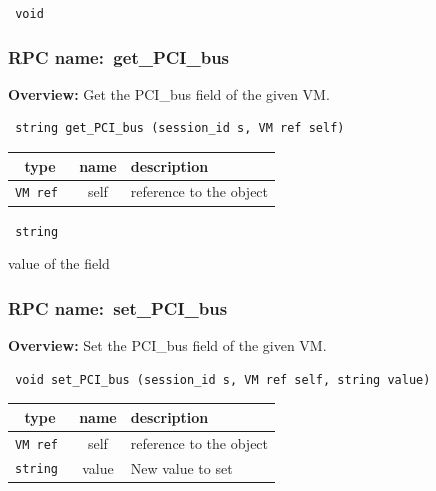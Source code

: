 {\tt 
void
}



\vspace{0.3cm}
\vspace{0.3cm}
\vspace{0.3cm}
\subsubsection{RPC name:~get\_PCI\_bus}

{\bf Overview:} 
Get the PCI\_bus field of the given VM.

\begin{verbatim} string get_PCI_bus (session_id s, VM ref self)\end{verbatim}



 
\vspace{0.3cm}
\begin{tabular}{|c|c|p{7cm}|}
 \hline
{\bf type} & {\bf name} & {\bf description} \\ \hline
{\tt VM ref } & self & reference to the object \\ \hline 

\end{tabular}

\vspace{0.3cm}

{\tt 
string
}


value of the field
\vspace{0.3cm}
\vspace{0.3cm}
\vspace{0.3cm}
\subsubsection{RPC name:~set\_PCI\_bus}

{\bf Overview:} 
Set the PCI\_bus field of the given VM.

\begin{verbatim} void set_PCI_bus (session_id s, VM ref self, string value)\end{verbatim}



 
\vspace{0.3cm}
\begin{tabular}{|c|c|p{7cm}|}
 \hline
{\bf type} & {\bf name} & {\bf description} \\ \hline
{\tt VM ref } & self & reference to the object \\ \hline 

{\tt string } & value & New value to set \\ \hline 

\end{tabular}

